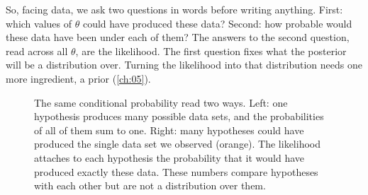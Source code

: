 So, facing data, we ask two questions in words before writing anything.
First: which values of $\theta$ could have produced these data? Second: how
probable would these data have been under each of them? The answers to the
second question, read across all $\theta$, are the likelihood. The first
question fixes what the posterior will be a distribution over. Turning the
likelihood into that distribution needs one more ingredient, a prior
(\cref{ch:05}).

\begin{figure}[htbp]
\centering
{}
\caption{The same conditional probability read two ways. Left: one
hypothesis produces many possible data sets, and the probabilities of all of
them sum to one. Right: many hypotheses could have produced the single data
set we observed (orange). The likelihood attaches to each hypothesis the
probability that it would have produced exactly these data. These numbers
compare hypotheses with each other but are not a distribution over them.}
\label{3b:fig:two-directions}
\end{figure}

